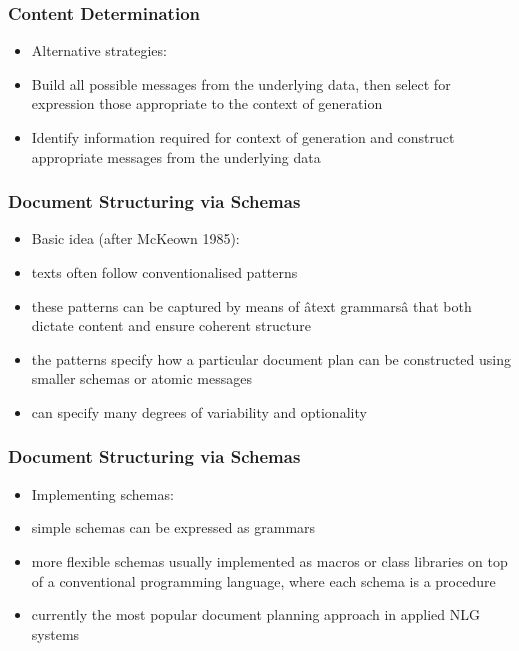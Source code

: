 \documentclass[compress,color=usenames]{beamer}
\begin{document}
\begin{frame}
\frametitle{Content Determination}

\label{f134}
\begin{itemize}
\item { {Alternative strategies:}}
\item { {Build all possible messages from the underlying data, then select for expression those appropriate to the context of generation}}
\item { {Identify information required for context of generation and construct appropriate messages from the underlying data}}
\end{itemize}

 
\end{frame}

\begin{frame}
\frametitle{Document Structuring via Schemas}

\label{f136}
\begin{itemize}
\item { {Basic idea (after McKeown 1985):}}
\item { {texts often follow conventionalised patterns}}
\item { {these patterns can be captured by means of \^atext grammars\^a that both dictate content and ensure coherent structure}}
\item { {the patterns specify how a particular document plan can be constructed using smaller schemas or atomic messages}}
\item { {can specify many degrees of variability and optionality}}
\end{itemize}

 
\end{frame}

\begin{frame}
\frametitle{Document Structuring via Schemas}

\label{f138}
\begin{itemize}
\item { {Implementing schemas:}}
\item { {simple schemas can be expressed as grammars}}
\item { {more flexible schemas usually implemented as macros or class libraries on top of a conventional programming language, where each schema is a procedure}}
\item { {currently the most popular document planning approach in applied NLG systems}}
\end{itemize}

 
\end{frame}
\end{document}
